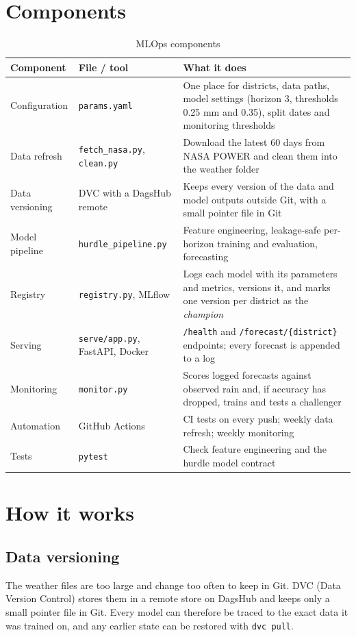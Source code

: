\section{Components}
\begin{table}[H]
	\centering
	\caption{MLOps components}
	\label{tab:mlops}
	\small
	\begin{tabularx}{\textwidth}{p{3.4cm}p{4.2cm}Y}
		\toprule
		\textbf{Component} & \textbf{File / tool} & \textbf{What it does} \\
		\midrule
		Configuration & \texttt{params.yaml} & One place for districts, data paths, model settings (horizon 3, thresholds 0.25 mm and 0.35), split dates and monitoring thresholds \\
		Data refresh & \texttt{fetch\_nasa.py}, \texttt{clean.py} & Download the latest 60 days from NASA POWER and clean them into the weather folder \\
		Data versioning & DVC with a DagsHub remote & Keeps every version of the data and model outputs outside Git, with a small pointer file in Git \\
		Model pipeline & \texttt{hurdle\_pipeline.py} & Feature engineering, leakage-safe per-horizon training and evaluation, forecasting \\
		Registry & \texttt{registry.py}, MLflow & Logs each model with its parameters and metrics, versions it, and marks one version per district as the \emph{champion} \\
		Serving & \texttt{serve/app.py}, FastAPI, Docker & \texttt{/health} and \texttt{/forecast/\{district\}} endpoints; every forecast is appended to a log \\
		Monitoring & \texttt{monitor.py} & Scores logged forecasts against observed rain and, if accuracy has dropped, trains and tests a challenger \\
		Automation & GitHub Actions & CI tests on every push; weekly data refresh; weekly monitoring \\
		Tests & \texttt{pytest} & Check feature engineering and the hurdle model contract \\
		\bottomrule
	\end{tabularx}
\end{table}

\section{How it works}

\subsection{Data versioning}
The weather files are too large and change too often to keep in Git. DVC (Data Version Control) stores them in a remote store on DagsHub and keeps only a small pointer file in Git. Every model can therefore be traced to the exact data it was trained on, and any earlier state can be restored with \texttt{dvc pull}.

